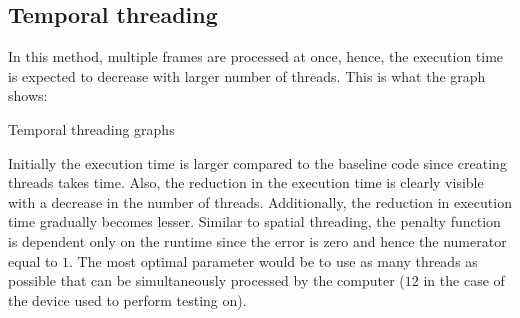 \documentclass{article}
\begin{document}
\subsection{Temporal threading}
In this method, multiple frames are processed at once, hence, the execution time is expected to decrease with larger number of threads. This is what the graph shows:
\begin{center}
    Temporal threading graphs
\end{center}
Initially the execution time is larger compared to the baseline code since creating threads takes time. Also, the reduction in the execution time is clearly visible with a decrease in the number of threads. Additionally, the reduction in execution time gradually becomes lesser. Similar to spatial threading, the penalty function is dependent only on the runtime since the error is zero and hence the numerator equal to $1$. The most optimal parameter would be to use as many threads as possible that can be simultaneously processed by the computer ($12$ in the case of the device used to perform testing on).
\end{document}
